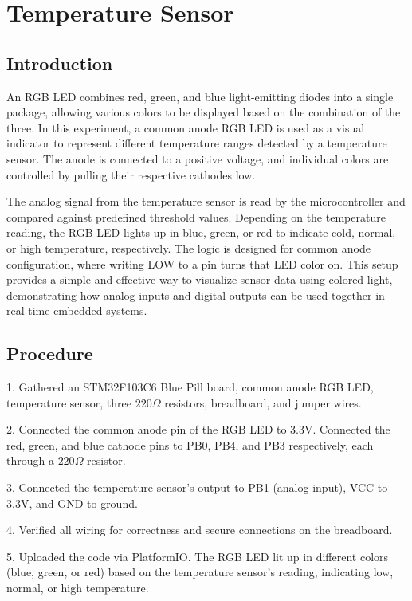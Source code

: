 \section{Temperature Sensor}

\subsection{Introduction}
An RGB LED combines red, green, and blue light-emitting diodes
into a single package, allowing various colors to be displayed based
on the combination of the three. In this experiment, a common anode RGB
LED is used as a visual indicator to represent different temperature ranges
detected by a temperature sensor. The anode is connected to a positive
voltage, and individual colors are controlled by pulling their respective
cathodes low.

The analog signal from the temperature sensor is read by the
microcontroller and compared against predefined threshold values.
Depending on the temperature reading, the RGB LED lights up in blue,
green, or red to indicate cold, normal, or high temperature, respectively.
The logic is designed for common anode configuration, where writing LOW
to a pin turns that LED color on. This setup provides a simple and effective
way to visualize sensor data using colored light, demonstrating how analog 
inputs and digital outputs can be used together in real-time embedded systems.

\subsection{Procedure}
1. Gathered an STM32F103C6 Blue Pill board, common anode RGB LED, 
temperature sensor, three $220\Omega$ resistors, breadboard, and jumper wires.

2. Connected the common anode pin of the RGB LED to 3.3V.
Connected the red, green, and blue cathode pins to PB0, PB4, and PB3
respectively, each through a $220\Omega$ resistor.

3. Connected the temperature sensor's output to PB1 (analog input),
VCC to 3.3V, and GND to ground.

4. Verified all wiring for correctness and secure connections 
on the breadboard.

5. Uploaded the code via PlatformIO. The RGB LED lit up in different
colors (blue, green, or red) based on the temperature sensor's reading,
indicating low, normal, or high temperature.
\newpage
